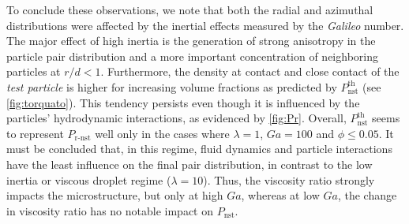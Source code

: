 To conclude these observations, we note that both the radial and azimuthal distributions were affected by the inertial effects measured by the \textit{Galileo} number. 
The major effect of high inertia is the generation of strong anisotropy in the particle pair distribution and a more important concentration of neighboring particles at $r/d < 1$. 
Furthermore, the density at contact and close contact of the \textit{test particle} is higher for increasing volume fractions as predicted by $P_\text{nst}^\text{th}$  (see \ref{fig:torquato}).
This tendency persists even though it is influenced by the particles' hydrodynamic interactions, as evidenced by \ref{fig:Pr}. 
Overall, $P_\text{nst}^\text{th}$ seems to represent $P_\text{r-nst}$ well only in the cases where $\lambda =1$, $Ga = 100$ and $\phi \le 0.05$. 
It must be concluded that, in this regime, fluid dynamics and particle interactions have the least influence on the final pair distribution, in contrast to the low inertia or viscous droplet regime ($\lambda =10$).
Thus, the viscosity ratio strongly impacts the microstructure, but only at high $Ga$, whereas at low $Ga$, the change in viscosity ratio has no notable impact on $P_\text{nst}$. 

